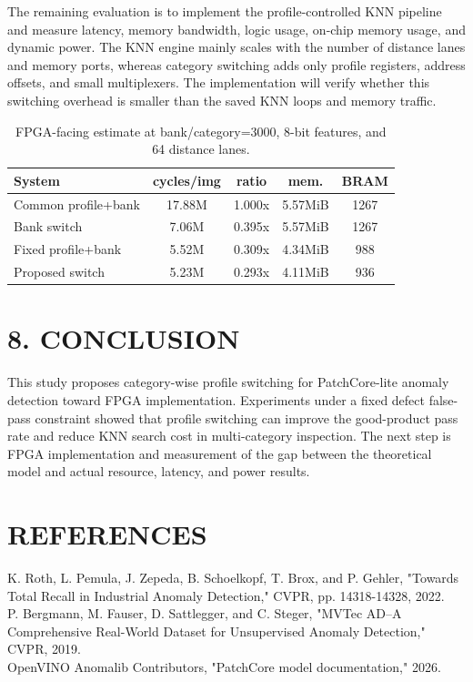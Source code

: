 \documentclass[a4paper,twocolumn,10pt]{article}
\begin{document}
The remaining evaluation is to implement the profile-controlled KNN pipeline and measure latency, memory bandwidth, logic usage, on-chip memory usage, and dynamic power. The KNN engine mainly scales with the number of distance lanes and memory ports, whereas category switching adds only profile registers, address offsets, and small multiplexers. The implementation will verify whether this switching overhead is smaller than the saved KNN loops and memory traffic.

\begin{table}[h]\centering\small
\caption{FPGA-facing estimate at bank/category=3000, 8-bit features, and 64 distance lanes.}
\begin{tabular}{lcccc}\toprule System & cycles/img & ratio & mem. & BRAM\\\midrule
Common profile+bank & 17.88M & 1.000x & 5.57MiB & 1267\\
Bank switch & 7.06M & 0.395x & 5.57MiB & 1267\\
Fixed profile+bank & 5.52M & 0.309x & 4.34MiB & 988\\
Proposed switch & 5.23M & 0.293x & 4.11MiB & 936\\
\bottomrule\end{tabular}\end{table}
\section*{8. CONCLUSION}
This study proposes category-wise profile switching for PatchCore-lite anomaly detection toward FPGA implementation. Experiments under a fixed defect false-pass constraint showed that profile switching can improve the good-product pass rate and reduce KNN search cost in multi-category inspection. The next step is FPGA implementation and measurement of the gap between the theoretical model and actual resource, latency, and power results.

\section*{REFERENCES}
\noindent [1] K. Roth, L. Pemula, J. Zepeda, B. Schoelkopf, T. Brox, and P. Gehler, "Towards Total Recall in Industrial Anomaly Detection," CVPR, pp. 14318-14328, 2022.\\
\noindent [2] P. Bergmann, M. Fauser, D. Sattlegger, and C. Steger, "MVTec AD--A Comprehensive Real-World Dataset for Unsupervised Anomaly Detection," CVPR, 2019.\\
\noindent [3] OpenVINO Anomalib Contributors, "PatchCore model documentation," 2026.\\
\end{document}
